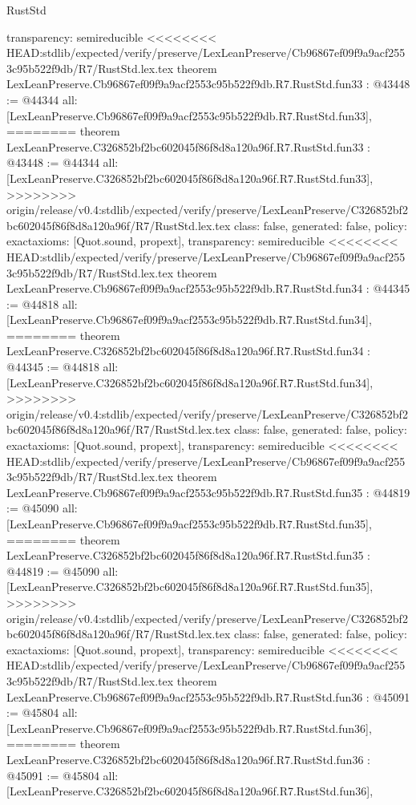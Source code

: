 \begin{lexlean}{RustStd}
\begin{coremodule}
{\begin{coremodule}
{{{{{{{{{{{{{{{{{{{{{{{{{{{{{{{{{{{{  transparency: semireducible
}
<<<<<<<< HEAD:stdlib/expected/verify/preserve/LexLeanPreserve/Cb96867ef09f9a9acf2553c95b522f9db/R7/RustStd.lex.tex
theorem LexLeanPreserve.Cb96867ef09f9a9acf2553c95b522f9db.R7.RustStd.fun33 : @43448 := @44344 {
  all: [LexLeanPreserve.Cb96867ef09f9a9acf2553c95b522f9db.R7.RustStd.fun33],
========
theorem LexLeanPreserve.C326852bf2bc602045f86f8d8a120a96f.R7.RustStd.fun33 : @43448 := @44344 {
  all: [LexLeanPreserve.C326852bf2bc602045f86f8d8a120a96f.R7.RustStd.fun33],
>>>>>>>> origin/release/v0.4:stdlib/expected/verify/preserve/LexLeanPreserve/C326852bf2bc602045f86f8d8a120a96f/R7/RustStd.lex.tex
  class: false,
  generated: false,
  policy: exact{axioms: [Quot.sound, propext]},
  transparency: semireducible
}
<<<<<<<< HEAD:stdlib/expected/verify/preserve/LexLeanPreserve/Cb96867ef09f9a9acf2553c95b522f9db/R7/RustStd.lex.tex
theorem LexLeanPreserve.Cb96867ef09f9a9acf2553c95b522f9db.R7.RustStd.fun34 : @44345 := @44818 {
  all: [LexLeanPreserve.Cb96867ef09f9a9acf2553c95b522f9db.R7.RustStd.fun34],
========
theorem LexLeanPreserve.C326852bf2bc602045f86f8d8a120a96f.R7.RustStd.fun34 : @44345 := @44818 {
  all: [LexLeanPreserve.C326852bf2bc602045f86f8d8a120a96f.R7.RustStd.fun34],
>>>>>>>> origin/release/v0.4:stdlib/expected/verify/preserve/LexLeanPreserve/C326852bf2bc602045f86f8d8a120a96f/R7/RustStd.lex.tex
  class: false,
  generated: false,
  policy: exact{axioms: [Quot.sound, propext]},
  transparency: semireducible
}
<<<<<<<< HEAD:stdlib/expected/verify/preserve/LexLeanPreserve/Cb96867ef09f9a9acf2553c95b522f9db/R7/RustStd.lex.tex
theorem LexLeanPreserve.Cb96867ef09f9a9acf2553c95b522f9db.R7.RustStd.fun35 : @44819 := @45090 {
  all: [LexLeanPreserve.Cb96867ef09f9a9acf2553c95b522f9db.R7.RustStd.fun35],
========
theorem LexLeanPreserve.C326852bf2bc602045f86f8d8a120a96f.R7.RustStd.fun35 : @44819 := @45090 {
  all: [LexLeanPreserve.C326852bf2bc602045f86f8d8a120a96f.R7.RustStd.fun35],
>>>>>>>> origin/release/v0.4:stdlib/expected/verify/preserve/LexLeanPreserve/C326852bf2bc602045f86f8d8a120a96f/R7/RustStd.lex.tex
  class: false,
  generated: false,
  policy: exact{axioms: [Quot.sound, propext]},
  transparency: semireducible
}
<<<<<<<< HEAD:stdlib/expected/verify/preserve/LexLeanPreserve/Cb96867ef09f9a9acf2553c95b522f9db/R7/RustStd.lex.tex
theorem LexLeanPreserve.Cb96867ef09f9a9acf2553c95b522f9db.R7.RustStd.fun36 : @45091 := @45804 {
  all: [LexLeanPreserve.Cb96867ef09f9a9acf2553c95b522f9db.R7.RustStd.fun36],
========
theorem LexLeanPreserve.C326852bf2bc602045f86f8d8a120a96f.R7.RustStd.fun36 : @45091 := @45804 {
  all: [LexLeanPreserve.C326852bf2bc602045f86f8d8a120a96f.R7.RustStd.fun36],
}}}}}}}}}}}}}}}}}}}}}}}}}}}}}}}}}}}}}}}}
\end{coremodule}}
\end{coremodule}
\end{lexlean}
